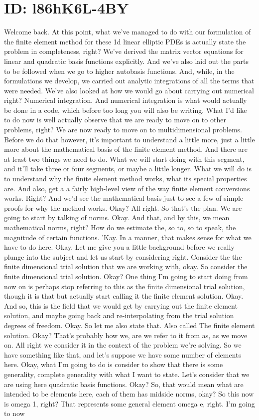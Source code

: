 \documentclass[10pt]{article}
\begin{document}
{\section*{ID: l86hK6L-4BY}
Welcome back. At this point, what we've managed to do with our formulation of the finite element method for these 1d linear elliptic PDEs is actually state the problem in completeness, right? We've derived the matrix vector equations for linear and quadratic basis functions explicitly. And we've also laid out the parts to be followed when we go to higher autobasis functions. And, while, in the formulations we develop, we carried out analytic integrations of all the terms that were needed. We've also looked at how we would go about carrying out numerical right? Numerical integration. And numerical integration is what would actually be done in a code, which before too long you will also be writing. What I'd like to do now is well actually observe that we are ready to move on to other problems, right? We are now ready to move on to multidimensional problems. Before we do that however, it's important to understand a little more, just a little more about the mathematical basis of the finite element method. And there are at least two things we need to do. What we will start doing with this segment, and it'll take three or four segments, or maybe a little longer. What we will do is to understand why the finite element method works, what its special properties are. And also, get a a fairly high-level view of the way finite element conversions works. Right? And we'd see the mathematical basis just to see a few of simple proofs for why the method works. Okay? All right. So that's the plan. We are going to start by talking of norms. Okay. And that, and by this, we mean mathematical norms, right? How do we estimate the, so to, so to speak, the magnitude of certain functions. 'Kay. In a manner, that makes sense for what we have to do here. Okay. Let me give you a little background before we really plunge into the subject and let us start by considering right. Consider the the finite dimensional trial solution that we are working with, okay. So consider the finite dimensional  trial solution. Okay? One thing I'm going to start doing from now on is perhaps stop referring to this as the finite dimensional trial solution, though it is that but actually start calling it the finite element solution. Okay. And so, this is the field that we would get by carrying out the finite element solution, and maybe going back and re-interpolating from the trial solution degrees of freedom. Okay. So let me also state that. Also called The finite element solution. Okay? That's probably how we, are we refer to it from as, as we move on. All right we consider it in the context of the problem we're solving. So we have something like that, and let's suppose we have some number of elements here. Okay, what I'm going to do is consider to show that there is some generality, complete generality with what I want to state. Let's consider that we are using here quadratic basis functions. Okay? So, that would mean what are intended to be elements here, each of them has midside norms, okay? So this now is omega 1, right? That represents some general element omega e, right. I'm going to now }
\end{document}
